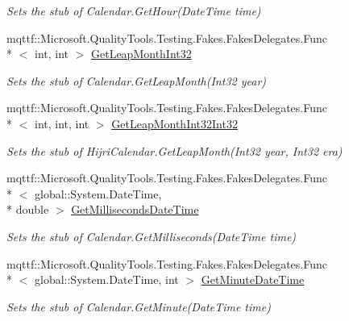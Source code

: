 \begin{DoxyCompactItemize}
\begin{DoxyCompactList}\small\item\em Sets the stub of Calendar.\-Get\-Hour(\-Date\-Time time)\end{DoxyCompactList}\item 
mqttf\-::\-Microsoft.\-Quality\-Tools.\-Testing.\-Fakes.\-Fakes\-Delegates.\-Func\\*
$<$ int, int $>$ \hyperlink{class_system_1_1_globalization_1_1_fakes_1_1_stub_hijri_calendar_a8ab7deb8c19696611affbdb9bb9853ad}{Get\-Leap\-Month\-Int32}
\begin{DoxyCompactList}\small\item\em Sets the stub of Calendar.\-Get\-Leap\-Month(\-Int32 year)\end{DoxyCompactList}\item 
mqttf\-::\-Microsoft.\-Quality\-Tools.\-Testing.\-Fakes.\-Fakes\-Delegates.\-Func\\*
$<$ int, int, int $>$ \hyperlink{class_system_1_1_globalization_1_1_fakes_1_1_stub_hijri_calendar_a35010643ae40908b71d7a19470837cc7}{Get\-Leap\-Month\-Int32\-Int32}
\begin{DoxyCompactList}\small\item\em Sets the stub of Hijri\-Calendar.\-Get\-Leap\-Month(\-Int32 year, Int32 era)\end{DoxyCompactList}\item 
mqttf\-::\-Microsoft.\-Quality\-Tools.\-Testing.\-Fakes.\-Fakes\-Delegates.\-Func\\*
$<$ global\-::\-System.\-Date\-Time, \\*
double $>$ \hyperlink{class_system_1_1_globalization_1_1_fakes_1_1_stub_hijri_calendar_a1474772fbd98eeba8c32ea105433a0a9}{Get\-Milliseconds\-Date\-Time}
\begin{DoxyCompactList}\small\item\em Sets the stub of Calendar.\-Get\-Milliseconds(\-Date\-Time time)\end{DoxyCompactList}\item 
mqttf\-::\-Microsoft.\-Quality\-Tools.\-Testing.\-Fakes.\-Fakes\-Delegates.\-Func\\*
$<$ global\-::\-System.\-Date\-Time, int $>$ \hyperlink{class_system_1_1_globalization_1_1_fakes_1_1_stub_hijri_calendar_aa972db975161b2bfed249370fd9fb1c9}{Get\-Minute\-Date\-Time}
\begin{DoxyCompactList}\small\item\em Sets the stub of Calendar.\-Get\-Minute(\-Date\-Time time)\end{DoxyCompactList}\item 

\end{DoxyCompactItemize}
